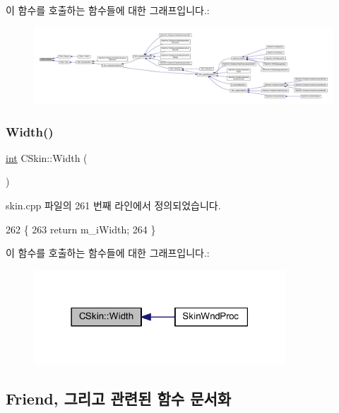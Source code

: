 이 함수를 호출하는 함수들에 대한 그래프입니다.\+:
\nopagebreak
\begin{figure}[H]
\begin{center}
\leavevmode
\includegraphics[width=350pt]{class_c_skin_ab8237ed204df8eb4632ef3bc921783a3_icgraph}
\end{center}
\end{figure}
\mbox{\label{class_c_skin_ae819e05e0e07c194d24bc8cdf5daeb94}} 
\subsubsection{\texorpdfstring{Width()}{Width()}}
{\footnotesize\ttfamily \mbox{\hyperlink{_util_8cpp_a0ef32aa8672df19503a49fab2d0c8071}{int}} C\+Skin\+::\+Width (\begin{DoxyParamCaption}{ }\end{DoxyParamCaption})}



skin.\+cpp 파일의 261 번째 라인에서 정의되었습니다.


\begin{DoxyCode}
262 \{
263   \textcolor{keywordflow}{return} m\_iWidth;
264 \}
\end{DoxyCode}
이 함수를 호출하는 함수들에 대한 그래프입니다.\+:
\nopagebreak
\begin{figure}[H]
\begin{center}
\leavevmode
\includegraphics[width=267pt]{class_c_skin_ae819e05e0e07c194d24bc8cdf5daeb94_icgraph}
\end{center}
\end{figure}


\subsection{Friend, 그리고 관련된 함수 문서화}
\mbox{\label{class_c_skin_ac58ecd226acd172d4941912f99e2cb12}} 
